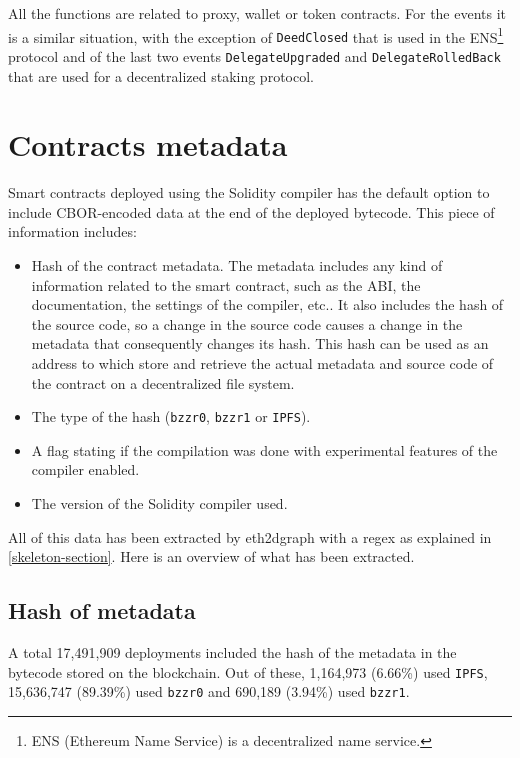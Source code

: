 All the functions are related to proxy, wallet or token contracts. For the events it is a similar situation, with the exception of {\tt DeedClosed} that is used in the ENS\footnote{ENS (Ethereum Name Service) is a decentralized name service.} protocol and of the last two events {\tt DelegateUpgraded} and {\tt DelegateRolledBack} that are used for a decentralized staking protocol.

\newpage

\section{Contracts metadata}

Smart contracts deployed using the Solidity compiler has the default option to include CBOR-encoded data at the end of the deployed bytecode. This piece of information includes:

\begin{itemize}
    \item Hash of the contract metadata. The metadata includes any kind of information related to the smart contract, such as the ABI, the documentation, the settings of the compiler, etc.. It also includes the hash of the source code, so a change in the source code causes a change in the metadata that consequently changes its hash. This hash can be used as an address to which store and retrieve the actual metadata and source code of the contract on a decentralized file system.
    \item The type of the hash ({\tt bzzr0}, {\tt bzzr1} or {\tt IPFS}).
    \item A flag stating if the compilation was done with experimental features of the compiler enabled.
    \item The version of the Solidity compiler used.
\end{itemize}

All of this data has been extracted by eth2dgraph with a regex as explained in \cref{skeleton-section}. Here is an overview of what has been extracted.

\subsection{Hash of metadata}

A total 17,491,909 deployments included the hash of the metadata in the bytecode stored on the blockchain. Out of these, 1,164,973 (6.66\%) used {\tt IPFS}, 15,636,747 (89.39\%) used {\tt bzzr0} and 690,189 (3.94\%) used {\tt bzzr1}. 

